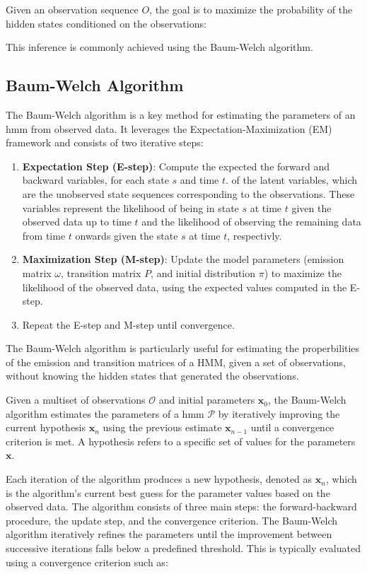 Given an observation sequence $O$, the goal is to maximize the probability of the hidden states conditioned on the observations:

This inference is commonly achieved using the Baum-Welch algorithm.

\subsection{Baum-Welch Algorithm}\label{subsec:baum-welch}
The Baum-Welch algorithm is a key method for estimating the parameters of an \gls{hmm} from observed data. It leverages the Expectation-Maximization (EM) framework and consists of two iterative steps:

\begin{enumerate}
    \item \textbf{Expectation Step (E-step)}: Compute the expected the forward and backward variables, for each state $s$ and time $t$. of the latent variables, which are the unobserved state sequences corresponding to the observations. These variables represent the likelihood of being in state $s$ at time $t$ given the observed data up to time $t$ and the likelihood of observing the remaining data from time $t$ onwards given the state $s$ at time $t$, respectivly. 
    \item \textbf{Maximization Step (M-step)}: Update the model parameters (emission matrix $\omega$, transition matrix $P$, and initial distribution $\pi$) to maximize the likelihood of the observed data, using the expected values computed in the E-step.
    \item Repeat the E-step and M-step until convergence.
\end{enumerate}


The Baum-Welch algorithm is particularly useful for estimating the properbilities of the emission and transition matrices of a HMM, given a set of observations, without knowing the hidden states that generated the observations.

Given a multiset of observations $\mathcal{O}$ and initial parameters $\textbf{x}_0$, the Baum-Welch algorithm estimates the parameters of a \gls{hmm} $\mathcal{P}$ by iteratively improving the current hypothesis $\textbf{x}_n$ using the previous estimate $\textbf{x}_{n-1}$ until a convergence criterion is met.
A hypothesis refers to a specific set of values for the parameters $\mathbf{x}$.

Each iteration of the algorithm produces a new hypothesis, denoted as $\textbf{x}_n$, which is the algorithm's current best guess for the parameter values based on the observed data.
The algorithm consists of three main steps: the forward-backward procedure, the update step, and the convergence criterion.
The Baum-Welch algorithm iteratively refines the parameters until the improvement between successive iterations falls below a predefined threshold.
This is typically evaluated using a convergence criterion such as:

